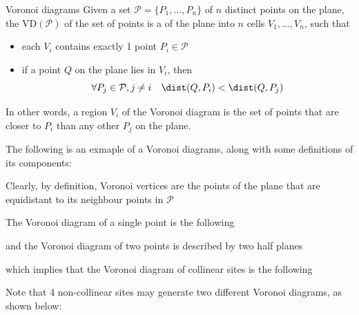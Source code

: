 \documentclass[a4paper, 12pt]{report}
\begin{document}
    \begin{frameddefn}{Voronoi diagrams}
        Given a set $\mathcal P = \{P_1, \ldots, P_n\}$ of $n$ distinct points on the plane, the  $\mathrm{VD}(\mathcal P)$ of the set of points is a  of the plane into $n$ cells $V_1, \ldots, V_n$, such that

        \begin{itemize}
            \item each $V_i$ contains exactly 1 point $P_i \in \mathcal P$
            \item if a point $Q$ on the plane lies in $V_i$, then $$\forall P_j \in \mathcal P, j \neq i \quad \dist(Q, P_i) < \dist(Q, P_j)$$
        \end{itemize}
    \end{frameddefn}

    In other words, a region $V_i$ of the Voronoi diagram is the set of points that are closer to $P_i$ than any other $P_j$ on the plane.

    \begin{example}
        The following is an exmaple of a Voronoi diagrams, along with some definitions of its components:

    \end{example}

    Clearly, by definition, Voronoi vertices are the points of the plane that are equidistant to its neighbour points in $\mathcal P$


    The Voronoi diagram of a single point is the following


    and the Voronoi diagram of two points is described by two half planes


    which implies that the Voronoi diagram of collinear sites is the following


    Note that 4 non-collinear sites may generate two different Voronoi diagrams, as shown below:
\end{document}
